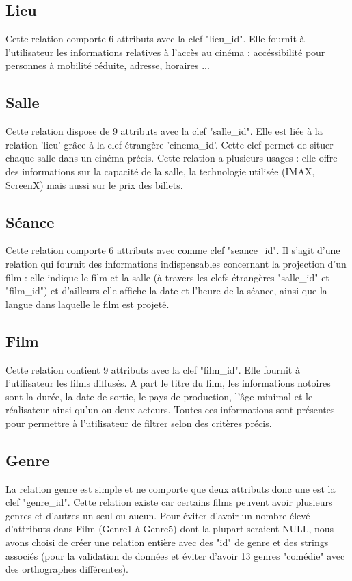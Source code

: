 \documentclass[12pt]{article}
\begin{document}
\subsection{Lieu}
Cette relation comporte 6 attributs avec la clef "lieu{\_}id". Elle fournit à l'utilisateur les informations
relatives à l'accès au cinéma : accéssibilité pour personnes à mobilité réduite, adresse, horaires ...
\subsection{Salle}
Cette relation dispose de 9 attributs avec la clef "salle{\_}id".
Elle est liée à la relation 'lieu' grâce à la clef étrangère 'cinema{\_}id'. Cette clef permet de situer chaque salle
dans un cinéma précis. Cette relation a plusieurs usages : elle offre des informations sur la capacité de la salle,
la technologie utilisée (IMAX, ScreenX) mais aussi sur le prix des billets.
\subsection{Séance}
Cette relation comporte 6 attributs avec comme clef "seance{\_}id". Il s'agit d'une relation qui fournit des informations
indispensables concernant la projection d'un film : elle indique le film et la salle (à travers les clefs étrangères "salle{\_}id"
et "film{\_}id") et d'ailleurs elle affiche la date et l'heure de la séance, ainsi que la langue dans laquelle le film est projeté.
\subsection{Film}
Cette relation contient 9 attributs avec la clef "film{\_}id". Elle fournit à l'utilisateur les films diffusés.
A part le titre du film, les informations notoires sont la durée, la date de sortie, le pays de production, l'âge minimal
et le réalisateur ainsi qu'un ou deux acteurs. Toutes ces informations sont présentes pour permettre à l'utilisateur de filtrer selon des critères précis.
\subsection{Genre}
La relation genre est simple et ne comporte que deux attributs donc une est la clef "genre{\_}id". 
Cette relation existe car certains films peuvent avoir plusieurs genres et d'autres un seul ou aucun. Pour éviter d'avoir 
un nombre élevé d'attributs dans Film (Genre1 à Genre5) dont la plupart seraient NULL, nous avons choisi de créer une 
relation entière avec des "id" de genre et des strings associés (pour la validation de données et éviter
d'avoir 13 genres "comédie" avec des orthographes différentes).
\end{document}
